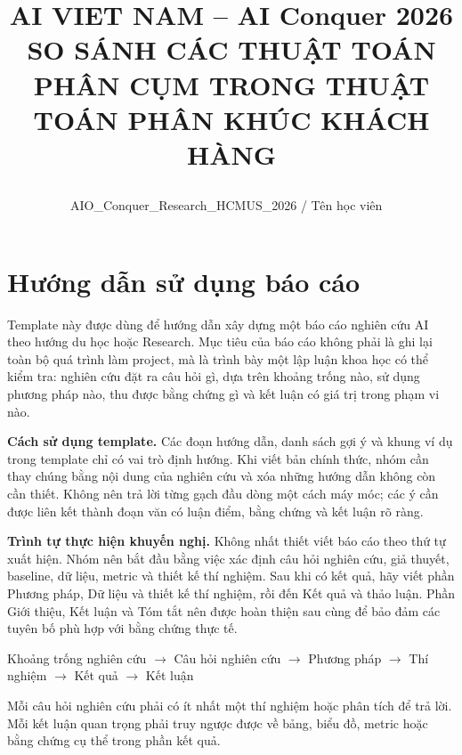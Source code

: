 \documentclass[12pt]{ai_conquer2026}
\title{%
  \begin{center}
        \Large {AI VIET NAM -- AI Conquer 2026}\\[.5ex]
        \Huge \textbf{SO SÁNH CÁC THUẬT TOÁN PHÂN CỤM TRONG THUẬT TOÁN PHÂN KHÚC KHÁCH HÀNG}\\[.5ex]
  \end{center}
}
\author{
\begin{minipage}{\textwidth}
\centering
{
\vspace{-1.5em}
AIO_Conquer_Research_HCMUS_2026 / Tên học viên
}\
\end{minipage}
}
\date{}
\begin{document}
\maketitle
\vspace{-5.5em}
\setlength{\epigraphwidth}{0.6\textwidth}

\section*{Hướng dẫn sử dụng báo cáo}

Template này được dùng để hướng dẫn xây dựng một báo cáo nghiên cứu AI theo hướng du học hoặc Research. Mục tiêu của báo cáo không phải là ghi lại toàn bộ quá trình làm project, mà là trình bày một lập luận khoa học có thể kiểm tra: nghiên cứu đặt ra câu hỏi gì, dựa trên khoảng trống nào, sử dụng phương pháp nào, thu được bằng chứng gì và kết luận có giá trị trong phạm vi nào.

\textbf{Cách sử dụng template.}
Các đoạn hướng dẫn, danh sách gợi ý và khung ví dụ trong template chỉ có vai trò định hướng. Khi viết bản chính thức, nhóm cần thay chúng bằng nội dung của nghiên cứu và xóa những hướng dẫn không còn cần thiết. Không nên trả lời từng gạch đầu dòng một cách máy móc; các ý cần được liên kết thành đoạn văn có luận điểm, bằng chứng và kết luận rõ ràng.

\textbf{Trình tự thực hiện khuyến nghị.}
Không nhất thiết viết báo cáo theo thứ tự xuất hiện. Nhóm nên bắt đầu bằng việc xác định câu hỏi nghiên cứu, giả thuyết, baseline, dữ liệu, metric và thiết kế thí nghiệm. Sau khi có kết quả, hãy viết phần Phương pháp, Dữ liệu và thiết kế thí nghiệm, rồi đến Kết quả và thảo luận. Phần Giới thiệu, Kết luận và Tóm tắt nên được hoàn thiện sau cùng để bảo đảm các tuyên bố phù hợp với bằng chứng thực tế.

\begin{aivncodebox}
\begin{center}
Khoảng trống nghiên cứu
$\rightarrow$
Câu hỏi nghiên cứu
$\rightarrow$
Phương pháp
$\rightarrow$
Thí nghiệm
$\rightarrow$
Kết quả
$\rightarrow$
Kết luận
\end{center}

Mỗi câu hỏi nghiên cứu phải có ít nhất một thí nghiệm hoặc phân tích để trả lời. Mỗi kết luận quan trọng phải truy ngược được về bảng, biểu đồ, metric hoặc bằng chứng cụ thể trong phần kết quả.
\end{aivncodebox}
\end{document}
